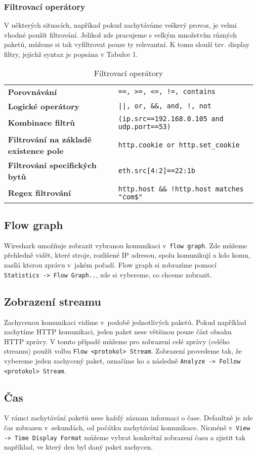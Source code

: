 \subsubsection{Filtrovací operátory}
V některých situacích, napříkad pokud zachytáváme veškerý provoz, je velmi vhodné použít filtrování. Jelikož zde pracujeme s velkým množstvím různých paketů, můžeme si tak vyfiltrovat pouze ty relevantní. K tomu slouží tzv. display filtry, jejichž syntax je popsána v Tabulce 1.
\begin{center}
\begin{table}[h]
\centering
\def\arraystretch{1.2}
\begin{tabular}{|l|l|}
\hline
\textbf{Porovnávání} & \texttt{==, >=, <=, !=, contains}\\
\textbf{Logické operátory} & \texttt{||, or, \&\&, and, !, not}\\
\textbf{Kombinace filtrů} & \texttt{(ip.src==192.168.0.105 and udp.port==53)}\\
\textbf{Filtrování na základě existence pole} & \texttt{http.cookie or http.set\_cookie}\\
\textbf{Filtrování specifických bytů} & \texttt{eth.src[4:2]==22:1b}\\
\textbf{Regex filtrování} & \texttt{http.host \&\& !http.host matches "\.com\$"}\\
\hline
\end{tabular}
\caption{Filtrovací operátory}
\end{table}
\end{center}


\subsection{Flow graph}
Wireshark umožňuje zobrazit vybranou komunikaci v~\texttt{flow graph}. Zde můžeme přehledně vidět, které stroje, rozlišené IP adresou, spolu komunikují a kdo komu, zasílá kterou zprávu v~jakém pořadí.
Flow graph si zobrazíme pomocí \texttt{Statistics -> Flow Graph..}, zde si vybereme, co chceme zobrazit.
\subsection{Zobrazení streamu}
Zachycenou komunikaci vidíme v~podobě jednotlivých paketů. Pokud například zachytíme HTTP komunikaci, jeden paket nese většinou pouze část obsahu HTTP zprávy. V tomto případě můžeme pro zobrazení celé zprávy (celého streamu) použít volbu \texttt{Flow <protokol> Stream}. Zobrazení provedeme tak, že vybereme jeden zachycený paket, označíme ho a následně \texttt{Analyze -> Follow <protokol> Stream}.
\subsection{Čas}
V rámci zachytávání paketů nese každý záznam informaci o čase. Defaultně je zde čas zobrazen v~sekundách, od počátku zachytávání komunikace. Nicméně v~\texttt{View -> Time Display Format} můžeme vybrat konkrétní zobrazení času a zjistit tak například, ve který den byl daný paket zachycen.
